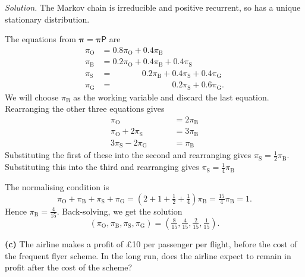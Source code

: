\documentclass[
  a4paper,
]{article}
\theoremstyle{definition}
\theoremstyle{definition}
\theoremstyle{definition}
\theoremstyle{remark}
\begin{document}
\begin{myanswers}
\emph{Solution.}
The Markov chain is irreducible and positive recurrent, so has a unique stationary distribution.

The equations from \(\boldsymbol\pi = \boldsymbol\pi \mathsf P\) are
\begin{align}
    \pi_{\mathrm O} &= 0.8 \pi_{\mathrm O} + 0.4 \pi_{\mathrm B } \\
    \pi_{\mathrm B} &= 0.2\pi_{\mathrm O} + 0.4\pi_{\mathrm B} + 0.4\pi_{\mathrm S} \\
    \pi_{\mathrm S} &= \phantom{0.2 \pi_{\mathrm S} +} 0.2 \pi_{\mathrm B} + 0.4 \pi_{\mathrm S} + 0.4 \pi_{\mathrm G} \\
    \pi_{\mathrm G} &= \phantom{0.2 \pi_{\mathrm S} + 0.2 \pi_{\mathrm B} +} 0.2 \pi_{\mathrm S} + 0.6 \pi_{\mathrm G} .
    \end{align}
We will choose \(\pi_{\mathrm B}\) as the working variable and discard the last equation. Rearranging the other three equations gives
\begin{align*}
\pi_{\mathrm O} \phantom{{}+ 2\pi_{\mathrm S} - 2\pi_{\mathrm G}} &= 2\pi_{\mathrm B} \\
\pi_{\mathrm O} + 2\pi_{\mathrm S} \phantom{{}- 2\pi_{\mathrm G}} &= 3\pi_{\mathrm B} \\
3\pi_{\mathrm S} - 2\pi_{\mathrm G} &= \pi_{\mathrm B} 
\end{align*}
Substituting the first of these into the second and rearranging gives \(\pi_{\mathrm S} = \frac12 \pi_{\mathrm B}\). Substituting this into the third and rearranging gives \(\pi_{\mathrm S} = \frac14 \pi_{\mathrm B}\)

The normalising condition is
\[ \pi_{\mathrm O} + \pi_{\mathrm B} + \pi_{\mathrm S} + \pi_{\mathrm G} = \left(2 + 1 + \tfrac12 + \tfrac14 \right)\pi_{\mathrm B} = \tfrac{15}{4} \pi_{\mathrm B} = 1 . \]
Hence \(\pi_{\mathrm B} = \frac{4}{15}\). Back-solving, we get the solution
\[ \left(\pi_{\mathrm O},\pi_{\mathrm B},\pi_{\mathrm S},\pi_{\mathrm G}\right) = \left(\tfrac8{15},\tfrac{4}{15},\tfrac{2}{15},\tfrac{1}{15} \right) . \]

\end{myanswers}

\textbf{(c)} The airline makes a profit of £10 per passenger per flight, before the cost of the frequent flyer scheme. In the long run, does the airline expect to remain in profit after the cost of the scheme?
\end{document}
